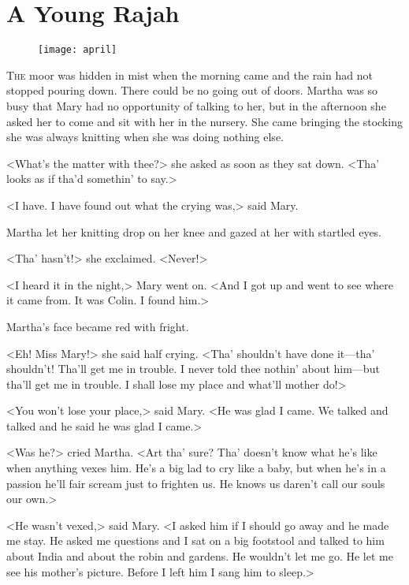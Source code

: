 \chapter{A Young Rajah} 
	
\begin{figure}[t!]
\centering
\texttt{[image: april]}
\end{figure}

	\lettrine[]{T}{he} moor was hidden in mist when the morning came and the rain had not stopped pouring down. There could be no going out of doors. Martha was so busy that Mary had no opportunity of talking to her, but in the afternoon she asked her to come and sit with her in the nursery. She came bringing the stocking she was always knitting when she was doing nothing else.

\zz
<What's the matter with thee?> she asked as soon as they sat down. <Tha' looks as if tha'd somethin' to say.>

<I have. I have found out what the crying was,> said Mary.

Martha let her knitting drop on her knee and gazed at her with startled eyes.

<Tha' hasn't!> she exclaimed. <Never!>

<I heard it in the night,> Mary went on. <And I got up and went to see where it came from. It was Colin. I found him.>

Martha's face became red with fright.

<Eh! Miss Mary!> she said half crying. <Tha' shouldn't have done it—tha' shouldn't! Tha'll get me in trouble. I never told thee nothin' about him—but tha'll get me in trouble. I shall lose my place and what'll mother do!>

<You won't lose your place,> said Mary. <He was glad I came. We talked and talked and he said he was glad I came.>

<Was he?> cried Martha. <Art tha' sure? Tha' doesn't know what he's like when anything vexes him. He's a big lad to cry like a baby, but when he's in a passion he'll fair scream just to frighten us. He knows us daren't call our souls our own.>

<He wasn't vexed,> said Mary. <I asked him if I should go away and he made me stay. He asked me questions and I sat on a big footstool and talked to him about India and about the robin and gardens. He wouldn't let me go. He let me see his mother's picture. Before I left him I sang him to sleep.>


